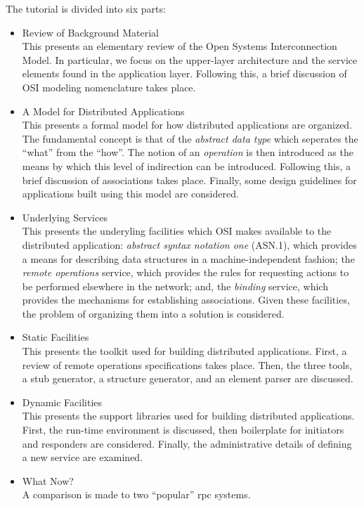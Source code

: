 The tutorial is divided into six parts:
\begin{itemize}
\item	Review of Background Material\\
This presents an elementary review of the Open Systems Interconnection Model.
In particular,
we focus on the upper-layer architecture and the service elements found in the
application layer.
Following this,
a brief discussion of OSI modeling nomenclature takes place.

\item	A Model for Distributed Applications\\
This presents a formal model for how distributed applications are organized.
The fundamental concept is that of the {\em abstract data type\/} which
seperates the ``what'' from the ``how''.
The notion of an {\em operation\/} is then introduced as the means by which
this level of indirection can be introduced.
Following this,
a brief discussion of associations takes place.
Finally,
some design guidelines for applications built using this model are considered.

\item	Underlying Services\\
This presents the underyling facilities which OSI makes available to the
distributed application:
{\em abstract syntax notation one\/} (ASN.1),
which provides a means for describing data structures in a machine-independent
fashion;
the {\em remote operations\/} service,
which provides the rules for requesting actions to be performed elsewhere in
the network;
and,
the {\em binding\/} service,
which provides the mechanisms for establishing associations.
Given these facilities,
the problem of organizing them into a solution is considered.

\item	Static Facilities\\
This presents the toolkit used for building distributed applications.
First,
a review of remote operations specifications takes place.
Then,
the three tools,
a stub generator, a structure generator, and an element parser are discussed.

\item	Dynamic Facilities\\
This presents the support libraries used for building distributed applications.
First,
the run-time environment is discussed,
then boilerplate for initiators and responders are considered.
Finally,
the administrative details of defining a new service are examined.

\item	What Now?\\
A comparison is made to two ``popular'' rpc systems.
\end{itemize}


